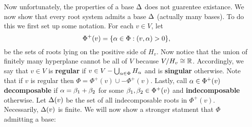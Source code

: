 \documentclass[12pt,reqno,oneside]{amsart}
\begin{document}
    Now unfortunately, the properties of a base $\Delta$ does not guarentee existance. We now show that every root system admits a base $\Delta$ (actually many bases). To do this we first set up some notation. For each $v \in V$, let
    \[
        \Phi^{+}(v) = \{\alpha \in \Phi:(v,\alpha) > 0\},
    \]
    be the sets of roots lying on the positive side of $H_{v}$. Now notice that the union of finitely many hyperplane cannot be all of $V$ because $V/H_{v} \cong \mathbb{R}$. Accordingly, we say that $v \in V$ is \textbf{regular} if $v \in V-\bigcup_{\alpha \in \Phi}H_{\alpha}$ and is \textbf{singular} otherwise. Note that if $v$ is regular then $\Phi = \Phi^{+}(v)\cup -\Phi^{+}(v)$. Lastly, call $\alpha \in \Phi^{+}(v)$ \textbf{decomposable} if $\alpha = \beta_{1}+\beta_{2}$ for some $\beta_{1},\beta_{2} \in \Phi^{+}(v)$ and \textbf{indecomposable} otherwise. Let $\Delta(v)$ be the set of all indecomposable roots in $\Phi^{+}(v)$. Necessarily, $\Delta(v)$ is finite. We will now show a stronger statment that $\Phi$ admitting a base:
\end{document}
